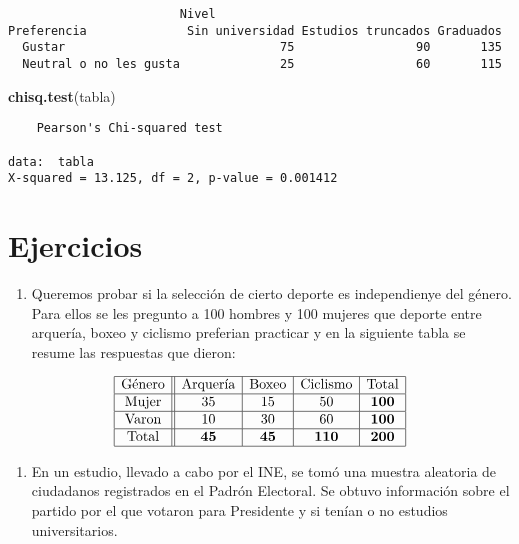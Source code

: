 \documentclass[
  a4paper,
  oneside,
  openany]{book}
\newenvironment{Shaded}{\begin{snugshade}}{\end{snugshade}}
\newcommand{\KeywordTok}[1]{\textcolor[rgb]{0.13,0.29,0.53}{\textbf{#1}}}
\newcommand{\NormalTok}[1]{#1}
\providecommand{\tightlist}{%
  \setlength{\itemsep}{0pt}\setlength{\parskip}{0pt}}
\begin{document}
\begin{verbatim}
                        Nivel
Preferencia              Sin universidad Estudios truncados Graduados
  Gustar                              75                 90       135
  Neutral o no les gusta              25                 60       115
\end{verbatim}

\begin{Shaded}
\begin{Highlighting}[]
\KeywordTok{chisq.test}\NormalTok{(tabla)}
\end{Highlighting}
\end{Shaded}

\begin{verbatim}
    Pearson's Chi-squared test

data:  tabla
X-squared = 13.125, df = 2, p-value = 0.001412
\end{verbatim}

\hypertarget{ejercicios-5}{%
\section{Ejercicios}\label{ejercicios-5}}

\begin{enumerate}
\def\labelenumi{\arabic{enumi}.}
\tightlist
\item
  Queremos probar si la selección de cierto deporte es independienye del género. Para ellos se les pregunto a 100 hombres y 100 mujeres que deporte entre arquería, boxeo y ciclismo preferian practicar y en la siguiente tabla se resume las respuestas que dieron:
\end{enumerate}

\[
\begin{array}{|c ||c |c |c|c|}
\hline 
\mbox{Género} & \mbox{Arquería}&\mbox{Boxeo} &\mbox{Ciclismo}& \mbox{Total} \\
\hline 
\mbox{Mujer} & 35 &  15 & 50&\textbf{100}\\
 \hline 
\mbox{Varon}& 10 & 30 &60&\textbf{100}\\ 
\hline 
\mbox{Total}&\textbf{45}&\textbf{45}&\textbf{110}&\textbf{200}\\
\hline 
\end{array}
\]

\begin{enumerate}
\def\labelenumi{\arabic{enumi}.}
\setcounter{enumi}{1}
\tightlist
\item
  En un estudio, llevado a cabo por el INE, se tomó una muestra aleatoria de ciudadanos registrados en el Padrón Electoral. Se obtuvo información sobre el partido por el que votaron para Presidente y si tenían o no estudios universitarios.
\end{enumerate}
\end{document}
